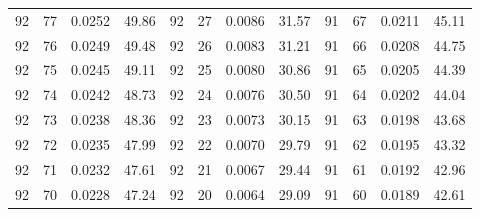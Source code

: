 \begin{tabular}{llll|llll|llll}
92 & 77 & 0.0252 & 49.86 & 92 & 27 & 0.0086 & 31.57 & 91 & 67 & 0.0211 & 45.11\\
92 & 76 & 0.0249 & 49.48 & 92 & 26 & 0.0083 & 31.21 & 91 & 66 & 0.0208 & 44.75\\
92 & 75 & 0.0245 & 49.11 & 92 & 25 & 0.0080 & 30.86 & 91 & 65 & 0.0205 & 44.39\\
92 & 74 & 0.0242 & 48.73 & 92 & 24 & 0.0076 & 30.50 & 91 & 64 & 0.0202 & 44.04\\
92 & 73 & 0.0238 & 48.36 & 92 & 23 & 0.0073 & 30.15 & 91 & 63 & 0.0198 & 43.68\\
92 & 72 & 0.0235 & 47.99 & 92 & 22 & 0.0070 & 29.79 & 91 & 62 & 0.0195 & 43.32\\
92 & 71 & 0.0232 & 47.61 & 92 & 21 & 0.0067 & 29.44 & 91 & 61 & 0.0192 & 42.96\\
92 & 70 & 0.0228 & 47.24 & 92 & 20 & 0.0064 & 29.09 & 91 & 60 & 0.0189 & 42.61\\
\bottomrule
\end{tabular}
\newpage
